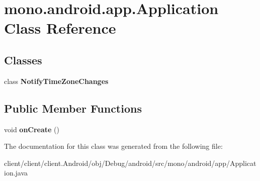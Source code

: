 \hypertarget{classmono_1_1android_1_1app_1_1Application}{}\section{mono.\+android.\+app.\+Application Class Reference}
\label{classmono_1_1android_1_1app_1_1Application}
\subsection*{Classes}
\begin{DoxyCompactItemize}
\item 
class {\bfseries Notify\+Time\+Zone\+Changes}
\end{DoxyCompactItemize}
\subsection*{Public Member Functions}
\begin{DoxyCompactItemize}
\item 
\hypertarget{classmono_1_1android_1_1app_1_1Application_a3d5ffff664cca7cefa13c1b7e3f4e5b1}{}void {\bfseries on\+Create} ()\label{classmono_1_1android_1_1app_1_1Application_a3d5ffff664cca7cefa13c1b7e3f4e5b1}

\end{DoxyCompactItemize}


The documentation for this class was generated from the following file\+:\begin{DoxyCompactItemize}
\item 
client/client/client.\+Android/obj/\+Debug/android/src/mono/android/app/Application.\+java\end{DoxyCompactItemize}
